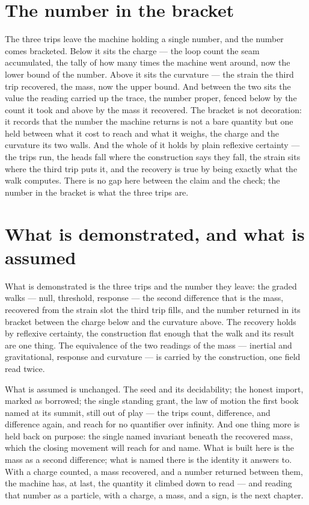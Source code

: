 \section{The number in the bracket}
\label{se:number-in-the-bracket}

The three trips leave the machine holding a single number, and the number comes bracketed. Below it sits the
charge --- the loop count the seam accumulated, the tally of how many times the machine went around, now the
lower bound of the number. Above it sits the curvature --- the strain the third trip recovered, the mass,
now the upper bound. And between the two sits the value the reading carried up the trace, the number proper,
fenced below by the count it took and above by the mass it recovered. The bracket is not decoration: it
records that the number the machine returns is not a bare quantity but one held between what it cost to reach
and what it weighs, the charge and the curvature its two walls. And the whole of it holds by plain
reflexive certainty --- the trips run, the heads fall where the construction says they fall, the strain sits
where the third trip puts it, and the recovery is true by being exactly what the walk computes. There is no
gap here between the claim and the check; the number in the bracket is what the three trips are.

\section{What is demonstrated, and what is assumed}
\label{se:demonstrated-assumed-III5}

What is demonstrated is the three trips and the number they leave: the graded walks --- null, threshold,
response --- the second difference that is the mass, recovered from the strain slot the third trip fills, and
the number returned in its bracket between the charge below and the curvature above. The recovery holds by
reflexive certainty, the construction flat enough that the walk and its result are one thing. The
equivalence of the two readings of the mass --- inertial and gravitational, response and curvature --- is
carried by the construction, one field read twice.

What is assumed is unchanged. The seed and its decidability; the honest import, marked as borrowed; the
single standing grant, the law of motion the first book named at its summit, still out of play --- the trips
count, difference, and difference again, and reach for no quantifier over infinity. And one thing more is
held back on purpose: the single named invariant beneath the recovered mass, which the closing movement will
reach for and name. What is built here is the mass as a second difference; what is named there is the
identity it answers to. With a charge counted, a mass recovered, and a number returned between them, the
machine has, at last, the quantity it climbed down to read --- and reading that number as a particle, with a
charge, a mass, and a sign, is the next chapter.
